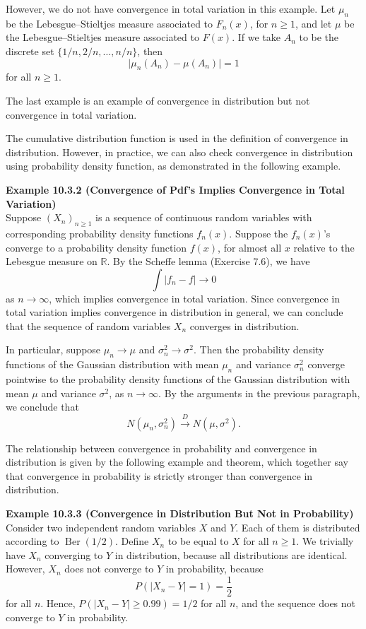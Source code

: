 However, we do not have convergence in total variation in this example. Let $\mu_n$ be the Lebesgue--Stieltjes measure associated to $F_n(x)$, for $n\geq 1$, and let $\mu$ be the Lebesgue--Stieltjes measure associated to $F(x)$. If we take $A_n$ to be the discrete set $\{1/n,2/n,\ldots,n/n\}$, then
\[
\lvert \mu_n(A_n)-\mu(A_n)\rvert=1
\]
for all $n\geq 1$.

The last example is an example of convergence in distribution but not convergence in total variation.

The cumulative distribution function is used in the definition of convergence in distribution. However, in practice, we can also check convergence in distribution using probability density function, as demonstrated in the following example.

\textbf{Example 10.3.2 (Convergence of Pdf's Implies Convergence in Total Variation)} \\
Suppose $(X_n)_{n\geq 1}$ is a sequence of continuous random variables with corresponding probability density functions $f_n(x)$. Suppose the $f_n(x)$'s converge to a probability density function $f(x)$, for almost all $x$ relative to the Lebesgue measure on $\mathbb{R}$. By the Scheffe lemma (Exercise 7.6), we have
\[
\int \lvert f_n-f\rvert\to 0
\]
as $n\to\infty$, which implies convergence in total variation. Since convergence in total variation implies convergence in distribution in general, we can conclude that the sequence of random variables $X_n$ converges in distribution.

In particular, suppose $\mu_n\to\mu$ and $\sigma_n^2\to\sigma^2$. Then the probability density functions of the Gaussian distribution with mean $\mu_n$ and variance $\sigma_n^2$ converge pointwise to the probability density functions of the Gaussian distribution with mean $\mu$ and variance $\sigma^2$, as $n\to\infty$. By the arguments in the previous paragraph, we conclude that
\[
N(\mu_n,\sigma_n^2)\xrightarrow{D}N(\mu,\sigma^2).
\]

The relationship between convergence in probability and convergence in distribution is given by the following example and theorem, which together say that convergence in probability is strictly stronger than convergence in distribution.

\textbf{Example 10.3.3 (Convergence in Distribution But Not in Probability)} \\
Consider two independent random variables $X$ and $Y$. Each of them is distributed according to $\operatorname{Ber}(1/2)$. Define $X_n$ to be equal to $X$ for all $n\geq 1$. We trivially have $X_n$ converging to $Y$ in distribution, because all distributions are identical. However, $X_n$ does not converge to $Y$ in probability, because
\[
P(\lvert X_n-Y\rvert=1)=\frac{1}{2}
\]
for all $n$. Hence, $P(\lvert X_n-Y\rvert\geq 0.99)=1/2$ for all $n$, and the sequence does not converge to $Y$ in probability.

